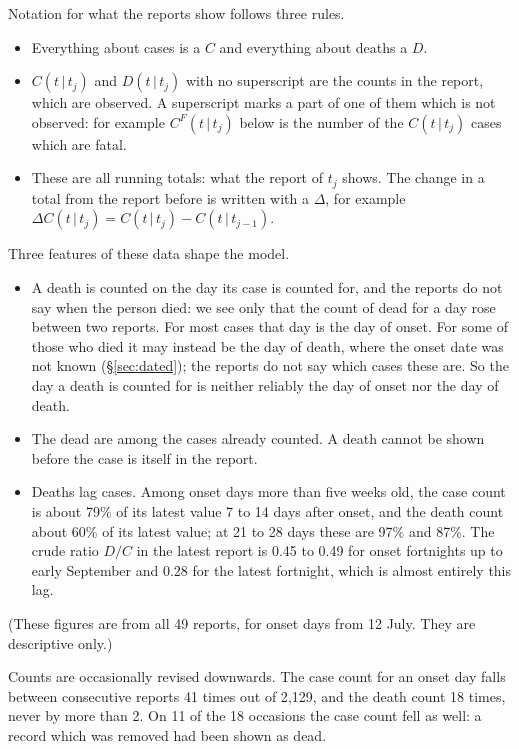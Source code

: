 \documentclass[11pt,a4paper]{article}
\newcommand{\given}{\,|\,}
\begin{document}
Notation for what the reports show follows three rules.
\begin{itemize}
\item Everything about cases is a $C$ and everything about deaths a $D$.
\item $C(t\given t_j)$ and $D(t\given t_j)$ with no superscript are the
counts in the report, which are observed. A superscript marks a part of one
of them which is not observed: for example $C^{F}(t\given t_j)$ below is
the number of the $C(t\given t_j)$ cases which are fatal.
\item These are all running totals: what the report of $t_j$ shows. The
change in a total from the report before is written with a $\Delta$, for
example $\Delta C(t\given t_j)=C(t\given t_j)-C(t\given t_{j-1})$.
\end{itemize}
Three features of these data shape the model.
\begin{itemize}
\item A death is counted on the day its case is counted for, and the reports
do not say when the person died: we see only that the count of dead for a
day rose between two reports. For most cases that day is the day of onset.
For some of those who died it may instead be the day of death, where the
onset date was not known (\S\ref{sec:dated}); the reports do not say which
cases these are. So the day a death is counted for is neither reliably the
day of onset nor the day of death.
\item The dead are among the cases already counted. A death cannot be shown
before the case is itself in the report.
\item Deaths lag cases. Among onset days more than five weeks old, the case
count is about 79\% of its latest value 7 to 14 days after onset, and the
death count about 60\% of its latest value; at 21 to 28 days these are 97\%
and 87\%. The crude ratio $D/C$ in the latest report is 0.45 to 0.49 for
onset fortnights up to early September and 0.28 for the latest fortnight,
which is almost entirely this lag.
\end{itemize}
(These figures are from all 49 reports, for onset days from 12 July. They are
descriptive only.)

Counts are occasionally revised downwards. The case count for an onset day
falls between consecutive reports 41 times out of 2{,}129, and the death
count 18 times, never by more than 2. On 11 of the 18 occasions the case
count fell as well: a record which was removed had been shown as dead.
\end{document}
